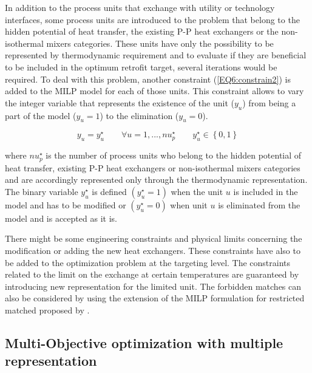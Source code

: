 In addition to the process units that exchange with utility or technology interfaces, some process units are introduced to the problem that belong to the hidden potential of heat transfer, the existing P-P heat exchangers or the non-isothermal mixers categories. These units have only the possibility to be represented by thermodynamic requirement and to evaluate if they are beneficial to be included in the optimum retrofit target, several iterations would be required. To deal with this problem, another constraint (\cref{EQ6:constrain2}) is added to the MILP model for each of those units. This constraint allows to vary the integer variable that represents the existence of the unit ($y_{u}$) from being a part of the model ($y_{u}=1$) to the elimination ($y_{u}=0$).

\begin{equation}
  y_{u} = y_{u}^{\star }  \quad  \quad \forall u=1,...,nu_{p}^{\star }  \quad \quad  y_{u}^{\star }\in 
  \left\{0,1 \right\}
\label{EQ6:constrain2}
\end{equation}

where $nu_{p}^{\star }$ is the number of process units who belong to the hidden potential of heat transfer, existing P-P heat exchangers or non-isothermal mixers categories and are accordingly represented only through the thermodynamic representation. The binary variable $y_{u}^{\star } $ is defined $(y_{u}^{\star }=1)$ when the unit $u$ is included in the model and has to be modified or $(y_{u}^{\star }=0)$ when unit $u$ is eliminated from the model and is accepted as it is. 

There might be some engineering constraints and physical limits concerning the modification or adding the new heat exchangers. These constraints have also to be added to the optimization problem at the targeting level. The constraints related to the limit on the exchange at certain temperatures are guaranteed by introducing new representation for the limited unit. The forbidden matches can also be considered by using the extension of the MILP formulation for restricted matched proposed by \citet{Becker2012104}. 
 
\subsection{Multi-Objective optimization with multiple representation}
\label{Sec6:MultiObjOptz}

